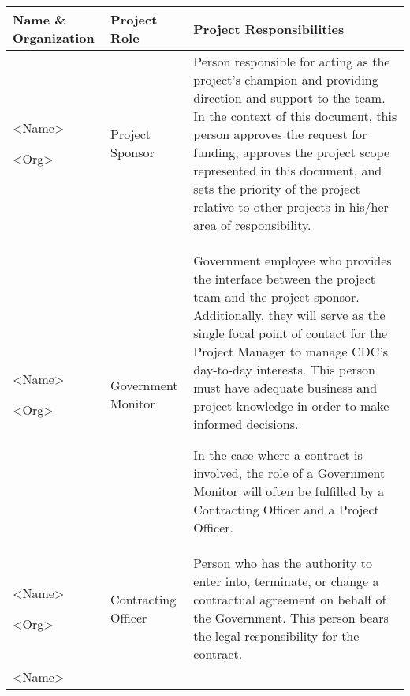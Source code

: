 \documentclass[a4paper, 11pt]{article}
\begin{document}
\begin{longtable}[]{@{}lll@{}}
\toprule
\textbf{Name \& Organization} & \textbf{Project Role} & \textbf{Project
Responsibilities}\tabularnewline
\midrule
\endhead
\begin{minipage}[t]{0.30\columnwidth}\raggedright
\textless{}Name\textgreater{}

\textless{}Org\textgreater{}\strut
\end{minipage} & \begin{minipage}[t]{0.30\columnwidth}\raggedright
Project Sponsor\strut
\end{minipage} & \begin{minipage}[t]{0.30\columnwidth}\raggedright
Person responsible for acting as the project's champion and providing
direction and support to the team. In the context of this document, this
person approves the request for funding, approves the project scope
represented in this document, and sets the priority of the project
relative to other projects in his/her area of responsibility.\strut
\end{minipage}\tabularnewline
\begin{minipage}[t]{0.30\columnwidth}\raggedright
\textless{}Name\textgreater{}

\textless{}Org\textgreater{}\strut
\end{minipage} & \begin{minipage}[t]{0.30\columnwidth}\raggedright
Government Monitor\strut
\end{minipage} & \begin{minipage}[t]{0.30\columnwidth}\raggedright
Government employee who provides the interface between the project team
and the project sponsor. Additionally, they will serve as the single
focal point of contact for the Project Manager to manage CDC's
day-to-day interests. This person must have adequate business and
project knowledge in order to make informed decisions.

In the case where a contract is involved, the role of a Government
Monitor will often be fulfilled by a Contracting Officer and a Project
Officer.\strut
\end{minipage}\tabularnewline
\begin{minipage}[t]{0.30\columnwidth}\raggedright
\textless{}Name\textgreater{}

\textless{}Org\textgreater{}\strut
\end{minipage} & \begin{minipage}[t]{0.30\columnwidth}\raggedright
Contracting Officer\strut
\end{minipage} & \begin{minipage}[t]{0.30\columnwidth}\raggedright
Person who has the authority to enter into, terminate, or change a
contractual agreement on behalf of the Government. This person bears the
legal responsibility for the contract.\strut
\end{minipage}\tabularnewline
\begin{minipage}[t]{0.30\columnwidth}\raggedright
\textless{}Name\textgreater{}


\end{minipage}
\end{longtable}
\end{document}

